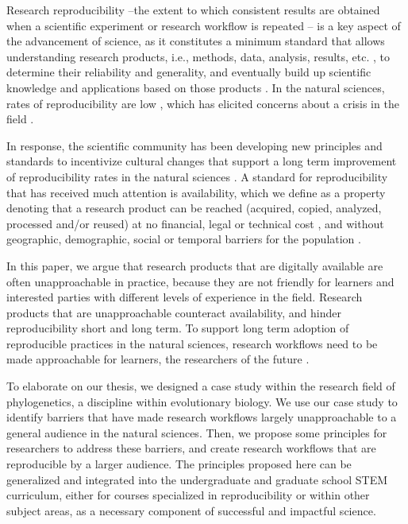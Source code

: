 \documentclass[12pt]{article}
\begin{document}
Research reproducibility --the extent to which consistent results are obtained when
a scientific experiment or research workflow is repeated \citep{repdef2021}--
is a key aspect of the advancement
of science, as it constitutes a minimum standard that allows understanding research products,
i.e., methods, data, analysis, results, etc. \citep{piwowar2013value},
to determine their reliability and generality, and eventually build up scientific
knowledge and applications based on those products
\citep{king1995replication, peng2011reproducible, powers2019open}.
In the natural sciences, rates of reproducibility are low \citep{ioannidis2005most, prinz2011believe},
which has elicited concerns about a crisis in the field \citep{baker2016reproducibility}.

In response, the scientific community has been developing new principles and standards to incentivize
cultural changes that support a long term improvement of reproducibility rates in the natural sciences
\citep{peng2015reproducibility, wilkinson2016fair, miyakawa2020no}.
A standard for reproducibility that has received much attention is availability, which
we define as a property denoting that a research product can be reached (acquired, copied, analyzed,
processed and/or reused) at no financial, legal or technical cost \citep{arnold2019turing},
and without geographic, demographic, social or temporal barriers for the population \citep{fecher2014open}.

In this paper, we argue that research products that are digitally available are
often unapproachable in practice, because they are not
friendly for learners and interested parties with different levels of
experience in the field. Research products that are unapproachable
counteract availability, and hinder reproducibility short and long term.
To support long term adoption of reproducible practices in the natural sciences, research
workflows need to be made approachable for learners, the researchers of the future \citep{roland2002think}.

To elaborate on our thesis, we designed a case study within the research field of
phylogenetics, a discipline within evolutionary biology.
We use our case study to identify barriers that have made research workflows
largely unapproachable to a general audience in the natural sciences.
Then, we propose some principles for researchers to address these barriers, and
create research workflows that are reproducible by a larger audience.
The principles proposed here can be generalized and integrated into the undergraduate
and graduate school STEM curriculum, either for courses specialized in reproducibility
or within other subject areas, as a necessary component of successful and impactful science.
\end{document}
